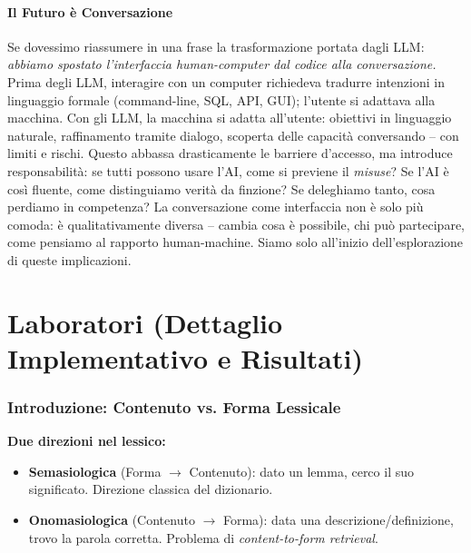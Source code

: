 \documentclass[12pt,a4paper]{article}
\begin{document}
\subsection{Il Futuro \`e Conversazione}

\begin{quizbox}
Se dovessimo riassumere in una frase la trasformazione portata dagli LLM: \emph{abbiamo spostato l'interfaccia human-computer dal codice alla conversazione.} Prima degli LLM, interagire con un computer richiedeva tradurre intenzioni in linguaggio formale (command-line, SQL, API, GUI); l'utente si adattava alla macchina. Con gli LLM, la macchina si adatta all'utente: obiettivi in linguaggio naturale, raffinamento tramite dialogo, scoperta delle capacit\`a conversando -- con limiti e rischi. Questo abbassa drasticamente le barriere d'accesso, ma introduce responsabilit\`a: se tutti possono usare l'AI, come si previene il \emph{misuse}? Se l'AI \`e cos\`i fluente, come distinguiamo verit\`a da finzione? Se deleghiamo tanto, cosa perdiamo in competenza? La conversazione come interfaccia non \`e solo pi\`u comoda: \`e qualitativamente diversa -- cambia cosa \`e possibile, chi pu\`o partecipare, come pensiamo al rapporto human-machine. Siamo solo all'inizio dell'esplorazione di queste implicazioni.
\end{quizbox}

\part{Laboratori (Dettaglio Implementativo e Risultati)}

\section{Introduzione: Contenuto vs. Forma Lessicale}

\begin{defbox}
\textbf{Due direzioni nel lessico:}
\begin{itemize}
  \item \textbf{Semasiologica} (Forma $\to$ Contenuto): dato un lemma, cerco il suo significato. Direzione classica del dizionario.
  \item \textbf{Onomasiologica} (Contenuto $\to$ Forma): data una descrizione/definizione, trovo la parola corretta. Problema di \emph{content-to-form retrieval}.
\end{itemize}
\end{defbox}
\end{document}
